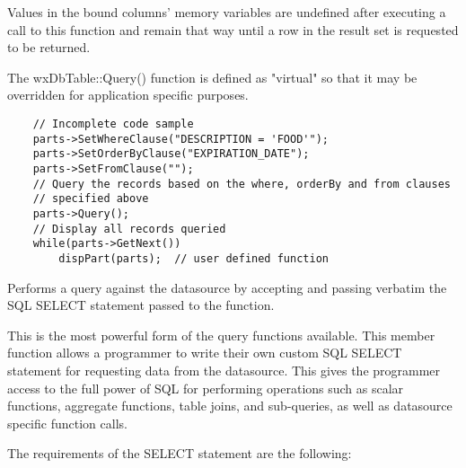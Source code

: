 Values in the bound columns' memory variables are undefined after executing a 
call to this function and remain that way until a row in the result set is 
requested to be returned.

The wxDbTable::Query() function is defined as "virtual" so that it may be 
overridden for application specific purposes.



\begin{verbatim}
    // Incomplete code sample
    parts->SetWhereClause("DESCRIPTION = 'FOOD'");
    parts->SetOrderByClause("EXPIRATION_DATE");
    parts->SetFromClause("");
    // Query the records based on the where, orderBy and from clauses 
    // specified above
    parts->Query();
    // Display all records queried
    while(parts->GetNext())
        dispPart(parts);  // user defined function
\end{verbatim}


\label{wxdbtablequerybysqlstmt}


Performs a query against the datasource by accepting and passing verbatim the 
SQL SELECT statement passed to the function.




This is the most powerful form of the query functions available.  This member 
function allows a programmer to write their own custom SQL SELECT statement 
for requesting data from the datasource.  This gives the programmer access 
to the full power of SQL for performing operations such as scalar functions, 
aggregate functions, table joins, and sub-queries, as well as datasource 
specific function calls.  

The requirements of the SELECT statement are the following:

